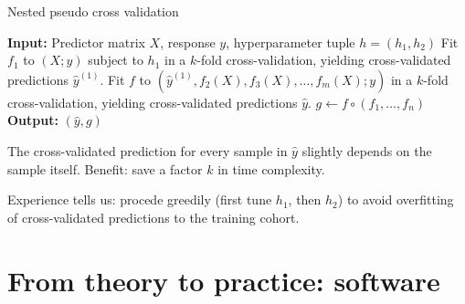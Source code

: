 \documentclass[10pt, aspectratio=169]{beamer}
\begin{document}
\begin{frame}{}
  \begin{algorithm}[H]
    \caption{Nested pseudo cross validation} \label{alg:nested-pcv}
    \begin{algorithmic}[1]
      \State \textbf{Input:} Predictor matrix $X$, response $y$, 
        hyperparameter tuple $h = (h_1, h_2)$
      \State Fit $f_1$ to $(X; y)$ subject to $h_1$ in a $k$-fold cross-validation, 
        yielding cross-validated predictions $\hat{y}^{(1)}$.
      \State Fit $f$ to $(\hat{y}^{(1)}, f_2(X), f_3(X), \ldots, f_m(X); y)$ 
        in a $k$-fold cross-validation, yielding cross-validated predictions 
        $\hat{y}$.
      \State $g \gets f \circ (f_1, \ldots, f_n)$
      \State \textbf{Output:} $(\hat{y}, g)$
    \end{algorithmic}
  \end{algorithm}

The  cross-validated prediction for every sample in $\hat{y}$ slightly 
depends on the sample itself. Benefit: save a factor $k$ in time complexity.

Experience tells us: procede greedily (first tune $h_1$, then $h_2$) to avoid 
overfitting of cross-validated predictions to the training cohort.
\end{frame}

\section{From theory to practice: software}
\end{document}
